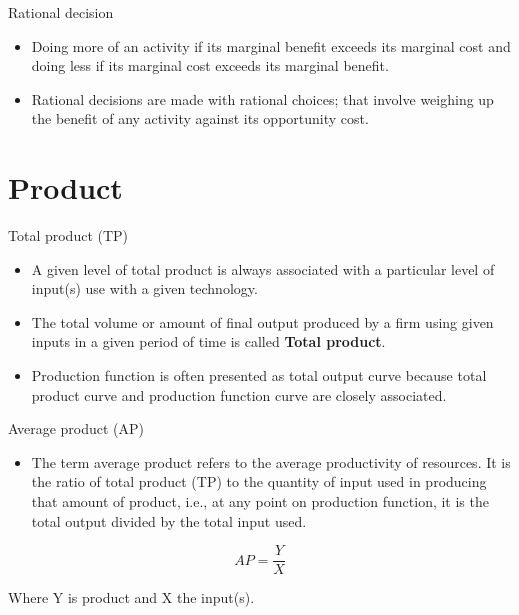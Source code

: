 \documentclass[12pt,ignorenonframetext,aspectratio=169]{beamer}
\providecommand{\tightlist}{%
  \setlength{\itemsep}{0pt}\setlength{\parskip}{0pt}}
\begin{document}
\begin{frame}{Rational decision}
\protect\hypertarget{rational-decision}{}
\begin{itemize}
\tightlist
\item
  Doing more of an activity if its marginal benefit exceeds its marginal
  cost and doing less if its marginal cost exceeds its marginal benefit.
\item
  Rational decisions are made with rational choices; that involve
  weighing up the benefit of any activity against its opportunity cost.
\end{itemize}
\end{frame}

\hypertarget{product}{%
\section{Product}\label{product}}

\begin{frame}{Total product (TP)}
\protect\hypertarget{total-product-tp}{}
\begin{itemize}
\tightlist
\item
  A given level of total product is always associated with a particular
  level of input(s) use with a given technology.
\item
  The total volume or amount of final output produced by a firm using
  given inputs in a given period of time is called \textbf{Total
  product}.
\item
  Production function is often presented as total output curve because
  total product curve and production function curve are closely
  associated.
\end{itemize}
\end{frame}

\begin{frame}{Average product (AP)}
\protect\hypertarget{average-product-ap}{}
\begin{itemize}
\tightlist
\item
  The term average product refers to the average productivity of
  resources. It is the ratio of total product (TP) to the quantity of
  input used in producing that amount of product, i.e., at any point on
  production function, it is the total output divided by the total input
  used.
\end{itemize}

\[
AP = \frac{Y}{X}
\]

Where Y is product and X the input(s).
\end{frame}
\end{document}
